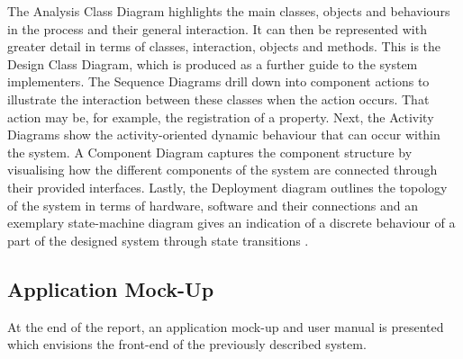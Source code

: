 The Analysis Class Diagram highlights the main classes, objects and behaviours in the process and their general interaction. It can then be represented with greater detail in terms of classes, interaction, objects and methods. This is the Design Class Diagram, which is produced as a further guide to the system implementers. The Sequence Diagrams drill down into component actions to illustrate the interaction between these classes when the action occurs. That action may be, for example, the registration of a property. Next, the Activity Diagrams show the activity-oriented dynamic behaviour that can occur within the system. A Component Diagram captures the component structure by visualising how the different components of the system are connected through their provided interfaces. Lastly, the Deployment diagram outlines the topology of the system in terms of hardware, software and their connections and an exemplary state-machine diagram gives an indication of a discrete behaviour of a part of the designed system through state transitions \cite{UML2017}.

\subsection{Application Mock-Up}
At the end of the report, an application mock-up and user manual is presented which envisions the front-end of the previously described system.